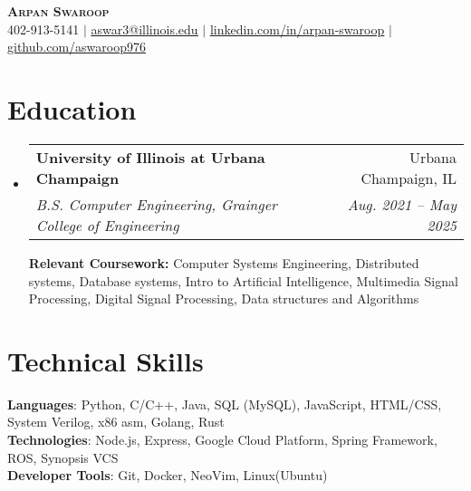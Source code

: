 \documentclass[letterpaper,10pt]{article}
\makeatletter
\newcommand{\resumeSubheading}[4]{
  \vspace{-2pt}\item
    \begin{tabular*}{0.97\textwidth}[t]{l@{\extracolsep{\fill}}r}
      \textbf{#1} & #2 \\
      \textit{\small#3} & \textit{\small #4} \\
    \end{tabular*}\vspace{-7pt}
}
\newcommand{\resumeSubHeadingListStart}{\begin{itemize}[leftmargin=0.15in, label={}, itemsep=0pt]}
\newcommand{\resumeSubHeadingListEnd}{\end{itemize}}
\makeatother
\begin{document}

\begin{center}
  \textbf{\Huge \scshape Arpan Swaroop} \\ \vspace{1pt}
  \small 402-913-5141 $|$ \href{mailto:aswar3@illinois.edu}{\underline{aswar3@illinois.edu}} $|$
  \href{https://www.linkedin.com/in/arpan-swaroop-008b04256/}{\underline{linkedin.com/in/arpan-swaroop}} $|$
  \href{https://github.com/aswaroop976}{\underline{github.com/aswaroop976}}
\end{center}


\section{Education}
\resumeSubHeadingListStart
\resumeSubheading
{University of Illinois at Urbana Champaign}{Urbana Champaign, IL}
{B.S. Computer Engineering, Grainger College of Engineering}{Aug. 2021 -- May 2025}
\newline
\newline
\textbf{Relevant Coursework: }Computer Systems Engineering, Distributed systems, Database systems, Intro to Artificial Intelligence, Multimedia Signal Processing, Digital Signal Processing, Data structures and Algorithms
\resumeSubHeadingListEnd
\section{Technical Skills}
\begin{itemize}[leftmargin=0.15in, label={}]
  \small{\item{
                \textbf{Languages}{: Python, C/C++, Java, SQL (MySQL), JavaScript, HTML/CSS, System Verilog, x86 asm, Golang, Rust} \\
                \textbf{Technologies}{: Node.js, Express, Google Cloud Platform, Spring Framework, ROS, Synopsis VCS} \\
                \textbf{Developer Tools}{: Git, Docker, NeoVim, Linux(Ubuntu)} \\
          }}
\end{itemize}
\end{document}
